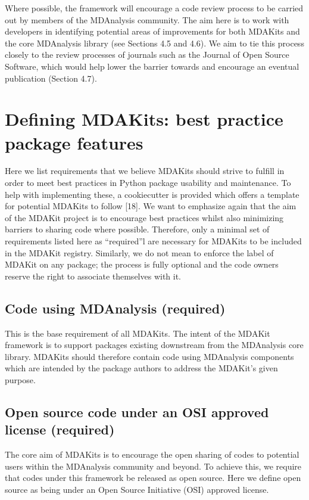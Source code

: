 \documentclass{article}
\begin{document}
Where possible, the framework will encourage a code review process to be carried out by members of the MDAnalysis community. The aim here is to work with developers in identifying potential areas of improvements for both MDAKits and the core MDAnalysis library (see Sections 4.5 and 4.6). We aim to tie this process closely to the review processes of journals such as the Journal of Open Source Software, which would help lower the barrier towards and encourage an eventual publication (Section 4.7).

\section{Defining MDAKits: best practice package features}

Here we list requirements that we believe MDAKits should strive to fulfill in order to meet best practices in Python package usability and maintenance. To help with implementing these, a cookiecutter is provided which offers a template for potential MDAKits to follow [18]. We want to emphasize again that the aim of the MDAKit project is to encourage best practices whilst also minimizing barriers to sharing code where possible. Therefore, only a minimal set of requirements listed here as “required”l are necessary for MDAKits to be included in the MDAKit registry. Similarly, we do not mean to enforce the label of MDAKit on any package; the process is fully optional and the code owners reserve the right to associate themselves with it.
 
\subsection{Code using MDAnalysis (required)}

This is the base requirement of all MDAKits. The intent of the MDAKit framework is to support packages existing downstream from the MDAnalysis core library. MDAKits should therefore contain code using MDAnalysis components which are intended by the package authors to address the MDAKit’s given purpose.
 
\subsection{Open source code under an OSI approved license (required)}

The core aim of MDAKits is to encourage the open sharing of codes to potential users within the MDAnalysis community and beyond. To achieve this, we require that codes under this framework be released as open source. Here we define open source as being under an Open Source Initiative (OSI) approved license.
\end{document}
